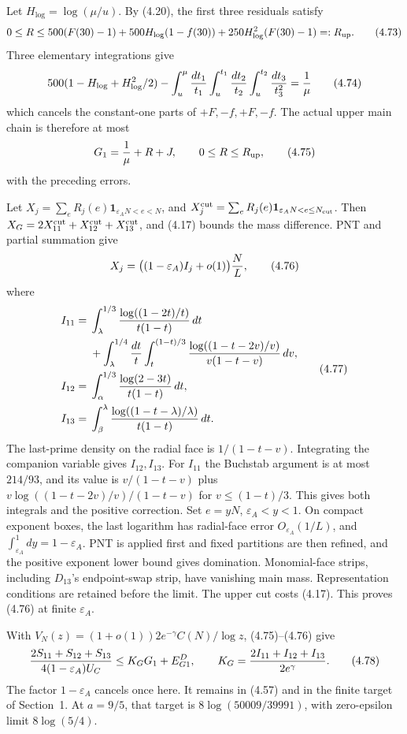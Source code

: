 Let $H_{\log}=\log(\mu/u)$.
By (4.20), the first three residuals satisfy
\[
 0\le R\le500(F(30)-1)+500H_{\log}(1-f(30))
                         +250H_{\log}^2(F(30)-1)=:R_{\rm up}.
 \tag{4.73}
\]
Three elementary integrations give
\[
 500(1-H_{\log}+H_{\log}^2/2)
 -\int_u^\mu{dt_1\over t_1}\int_u^{t_1}{dt_2\over t_2}
                            \int_u^{t_2}{dt_3\over t_3^2}
 ={1\over\mu}
 \tag{4.74}
\]
which cancels the constant-one parts of $+F,-f,+F,-f$.
The actual upper main chain is therefore at most
\[
 G_1={1\over\mu}+R+J,\qquad0\le R\le R_{\rm up},
 \tag{4.75}
\]
with the preceding errors.

Let $X_j=\sum_eR_j(e)\mathbf1_{\varepsilon_A N<e<N}$,
and $X_j^{\rm cut}=\sum_eR_j(e)\mathbf1_{\varepsilon_A N<e\le N_{\rm cut}}$.
Then $X_G=2X_{11}^{\rm cut}+X_{12}^{\rm cut}+X_{13}^{\rm cut}$, and (4.17) bounds the mass difference.
PNT and partial summation give
\[
 X_j=\big((1-\varepsilon_A)I_j+o(1)\big){N\over L},
 \tag{4.76}
\]
where
\[
\begin{aligned}
 I_{11}={}&\int_\lambda^{1/3}
       {\log((1-2t)/t)\over t(1-t)}\,dt\\
 &+\int_\lambda^{1/4}{dt\over t}
       \int_t^{(1-t)/3}{\log((1-t-2v)/v)\over v(1-t-v)}\,dv,\\
 I_{12}={}&\int_\alpha^{1/3}{\log(2-3t)\over t(1-t)}\,dt,\\
 I_{13}={}&\int_\beta^\lambda
       {\log((1-t-\lambda)/\lambda)\over t(1-t)}\,dt.
\end{aligned}
 \tag{4.77}
\]
The last-prime density on the radial face is $1/(1-t-v)$.
Integrating the companion variable gives $I_{12},I_{13}$.
For $I_{11}$ the Buchstab argument is at most $214/93$, and its value is $v/(1-t-v)$ plus
$v\log((1-t-2v)/v)/(1-t-v)$ for $v\le(1-t)/3$.
This gives both integrals and the positive correction.
Set $e=yN$, $\varepsilon_A<y<1$.
On compact exponent boxes, the last logarithm has radial-face error
$O_{\varepsilon_A}(1/L)$, and $\int_{\varepsilon_A}^1dy=1-\varepsilon_A$.
PNT is applied first and fixed partitions are then refined,
and the positive exponent lower bound gives domination.
Monomial-face strips, including $D_{13}$'s endpoint-swap strip, have vanishing main mass.
Representation conditions are retained before the limit.
The upper cut costs (4.17).
This proves (4.76) at finite $\varepsilon_A$.

With $V_N(z)=(1+o(1))2e^{-\gamma}C(N)/\log z$, (4.75)--(4.76) give
\[
 {2S_{11}+S_{12}+S_{13}\over4(1-\varepsilon_A)U_C}
 \le K_GG_1+E^D_{G1},\qquad
 K_G={2I_{11}+I_{12}+I_{13}\over2e^\gamma}.
 \tag{4.78}
\]
The factor $1-\varepsilon_A$ cancels once here.
It remains in (4.57) and in the finite target of Section~1.
At $a=9/5$, that target is $8\log(50009/39991)$, with zero-epsilon limit $8\log(5/4)$.

